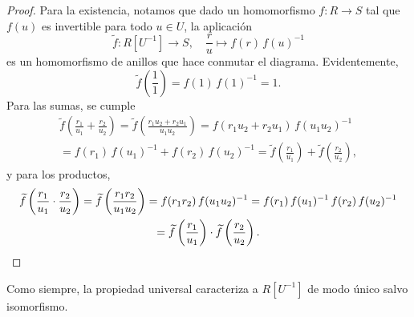 \begin{proposicion}
\begin{proof}
    Para la existencia, notamos que dado un homomorfismo $f\colon R\to S$ tal
    que $f (u)$ es invertible para todo $u\in U$, la aplicación
    $$\widetilde{f}\colon R [U^{-1}] \to S, \quad \frac{r}{u} \mapsto f (r)\,f(u)^{-1}$$
    es un homomorfismo de anillos que hace conmutar el diagrama. Evidentemente,
    $$\widetilde{f} \left(\frac{1}{1}\right) = f (1)\,f(1)^{-1} = 1.$$
    Para las sumas, se cumple
    \begin{multline*}
      \widetilde{f} \left(\frac{r_1}{u_1} + \frac{r_2}{u_2}\right) =
      \widetilde{f} \left(\frac{r_1 u_2 + r_2 u_1}{u_1 u_2}\right) =
      f (r_1 u_2 + r_2 u_1)\,f (u_1 u_2)^{-1} \\
      = f (r_1)\,f (u_1)^{-1} + f (r_2)\,f (u_2)^{-1} =
      \widetilde{f} \left(\frac{r_1}{u_1}\right) + \widetilde{f} \left(\frac{r_2}{u_2}\right),
    \end{multline*}
    y para los productos,
    \begin{multline*}
      \widetilde{f} \left(\frac{r_1}{u_1}\cdot\frac{r_2}{u_2}\right) =
      \widetilde{f} \left(\frac{r_1 r_2}{u_1 u_2}\right) =
      f (r_1 r_2)\,f (u_1 u_2)^{-1} =
      f (r_1)\,f (u_1)^{-1} \, f (r_2)\,f (u_2)^{-1} \\
      = \widetilde{f} \left(\frac{r_1}{u_1}\right)\cdot \widetilde{f} \left(\frac{r_2}{u_2}\right). \qedhere
    \end{multline*}
  \end{proof}
\end{proposicion}

Como siempre, la propiedad universal caracteriza a $R [U^{-1}]$ de modo único
salvo isomorfismo.


